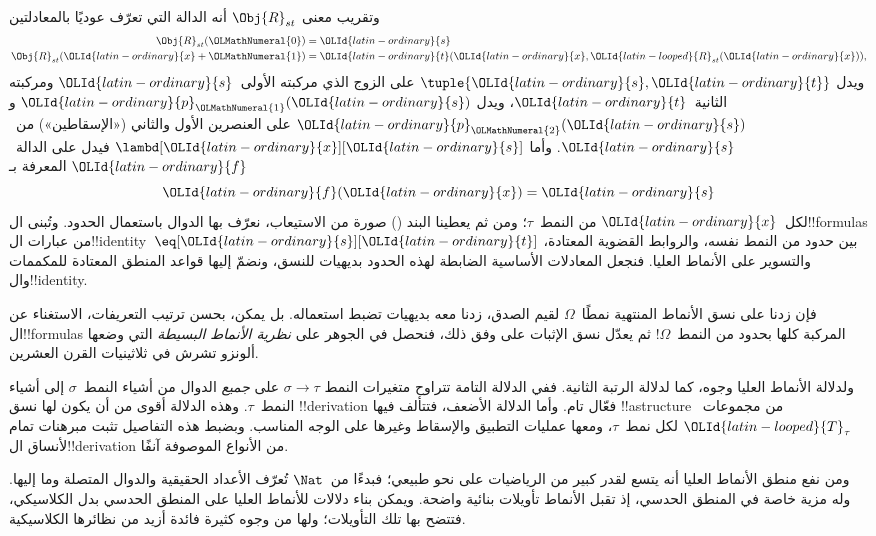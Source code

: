 \documentclass[../../../include/open-logic-section]{subfiles}
\begin{document}
وتقريب معنى $\Obj{R}_{st}$ أنه الدالة التي تعرّف عوديًا بالمعادلتين
\begin{align*}
\Obj{R}_{st}({\OLMathNumeral{0}}) & = {\OLId{latin-ordinary}{s}} \\
\Obj{R}_{st}({\OLId{latin-ordinary}{x}}+{\OLMathNumeral{1}}) & = {\OLId{latin-ordinary}{t}}({\OLId{latin-ordinary}{x}}, {\OLId{latin-looped}{R}}_{st}({\OLId{latin-ordinary}{x}})),
\end{align*}
ويدل $\tuple{{\OLId{latin-ordinary}{s}}, {\OLId{latin-ordinary}{t}}}$ على الزوج الذي مركبته الأولى~${\OLId{latin-ordinary}{s}}$ ومركبته
الثانية~${\OLId{latin-ordinary}{t}}$، ويدل ${\OLId{latin-ordinary}{p}}_{\OLMathNumeral{1}}({\OLId{latin-ordinary}{s}})$ و${\OLId{latin-ordinary}{p}}_{\OLMathNumeral{2}}({\OLId{latin-ordinary}{s}})$ على العنصرين الأول والثاني
(«الإسقاطين») من~${\OLId{latin-ordinary}{s}}$. وأما $\lambd[{\OLId{latin-ordinary}{x}}][{\OLId{latin-ordinary}{s}}]$ فيدل على الدالة~${\OLId{latin-ordinary}{f}}$
المعرفة بـ
\[
{\OLId{latin-ordinary}{f}}({\OLId{latin-ordinary}{x}}) = {\OLId{latin-ordinary}{s}}
\]
لكل~${\OLId{latin-ordinary}{x}}$ من النمط~$\tau$؛ ومن ثم يعطينا البند () صورة من الاستيعاب،
نعرّف بها الدوال باستعمال الحدود. وتُبنى ال!!{formula}s من
عبارات ال!!{identity}~$\eq[{\OLId{latin-ordinary}{s}}][{\OLId{latin-ordinary}{t}}]$ بين حدود من النمط نفسه، والروابط
القضوية المعتادة، والتسوير على الأنماط العليا. فنجعل
المعادلات الأساسية الضابطة لهذه الحدود بديهيات للنسق، ونضمّ إليها
قواعد المنطق المعتادة للمكممات وال!!{identity}.

فإن زدنا على نسق الأنماط المنتهية نمطًا~$\Omega$ لقيم الصدق،
زدنا معه بديهيات تضبط استعماله. بل يمكن، بحسن ترتيب التعريفات،
الاستغناء عن ال!!{formula}s المركبة كلها بحدود من النمط~$\Omega$!{}
ثم يعدّل نسق الإثبات على وفق ذلك، فنحصل في الجوهر على
\emph{نظرية الأنماط البسيطة} التي وضعها ألونزو تشرش في
ثلاثينيات القرن العشرين.

ولدلالة الأنماط العليا وجوه، كما لدلالة الرتبة الثانية.
ففي الدلالة التامة تتراوح متغيرات النمط $\sigma
\to \tau$ على \emph{جميع} الدوال من أشياء النمط~$\sigma$
إلى أشياء النمط~$\tau$. وهذه الدلالة أقوى من أن يكون لها
نسق !!{derivation} فعّال تام. وأما الدلالة الأضعف، فتتألف فيها
!!a{structure} من مجموعات~${\OLId{latin-looped}{T}}_\tau$ لكل نمط~$\tau$، ومعها
عمليات التطبيق والإسقاط وغيرها على الوجه المناسب. وبضبط هذه
التفاصيل تثبت مبرهنات تمام لأنساق ال!!{derivation} من الأنواع
الموصوفة آنفًا.

ومن نفع منطق الأنماط العليا أنه يتسع لقدر كبير من الرياضيات
على نحو طبيعي؛ فبدءًا من~$\Nat$ تُعرّف الأعداد الحقيقية والدوال
المتصلة وما إليها. وله مزية خاصة في المنطق الحدسي، إذ تقبل
الأنماط تأويلات بنائية واضحة. ويمكن بناء دلالات للأنماط العليا
على المنطق الحدسي بدل الكلاسيكي، فتتضح بها تلك التأويلات؛ ولها
من وجوه كثيرة فائدة أزيد من نظائرها الكلاسيكية.
\end{document}
